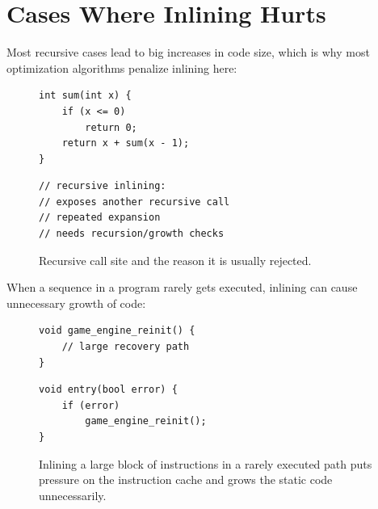 \documentclass[12pt, a4paper]{report}
\begin{document}
\section{Cases Where Inlining Hurts}

Most recursive cases lead to big increases in code size, which is why most
optimization algorithms penalize inlining here:

\begin{figure}[H]
\centering
\begin{minipage}[t]{0.47\textwidth}
\begin{verbatim}
int sum(int x) {
    if (x <= 0)
        return 0;
    return x + sum(x - 1);
}
\end{verbatim}
\end{minipage}\hfill
\begin{minipage}[t]{0.42\textwidth}
\begin{verbatim}
// recursive inlining:
// exposes another recursive call
// repeated expansion
// needs recursion/growth checks
\end{verbatim}
\end{minipage}
\caption{Recursive call site and the reason it is usually rejected.}
\label{fig:recursive-inline-risk}
\end{figure}

When a sequence in a program rarely gets executed, inlining can cause
unnecessary growth of code:

\begin{figure}[H]
\centering
\begin{minipage}[t]{0.47\textwidth}
\begin{verbatim}
void game_engine_reinit() {
    // large recovery path
}
\end{verbatim}
\end{minipage}\hfill
\begin{minipage}[t]{0.45\textwidth}
\begin{verbatim}
void entry(bool error) {
    if (error)
        game_engine_reinit();
}
\end{verbatim}
\end{minipage}
\caption{Inlining a large block of instructions in a rarely executed path puts
pressure on the instruction cache and grows the static code unnecessarily.}
\label{fig:cold-path-example}
\end{figure}
\end{document}
